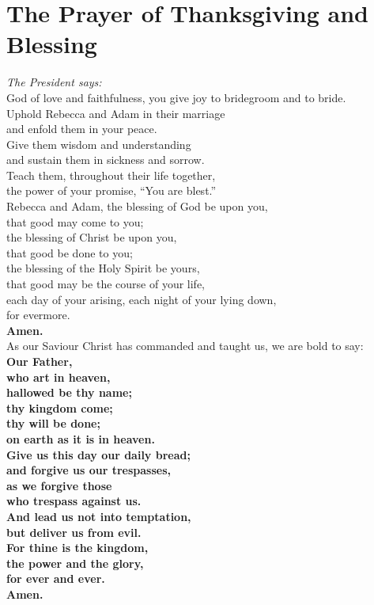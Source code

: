 \documentclass[a4paper,10pt,titlepage]{article}
\begin{document}
\clearpage
\section{The Prayer of Thanksgiving and Blessing}

{\em The President says:}\\
God of love and faithfulness, you give joy to bridegroom and to bride.\\
Uphold Rebecca and Adam in their marriage\\
and enfold them in your peace.\\
Give them wisdom and understanding\\
and sustain them in sickness and sorrow.\\
Teach them, throughout their life together,\\
the power of your promise, “You are blest.”\\


Rebecca and Adam, the blessing of God be upon you,\\
that good may come to you;\\
the blessing of Christ be upon you,\\
that good be done to you;\\
the blessing of the Holy Spirit be yours,\\
that good may be the course of your life,\\
each day of your arising, each night of your lying down,\\
for evermore.\\

{\bf Amen.}\\

As our Saviour Christ has commanded and taught us, we are bold to say:\\

{\bf Our Father,\\
who art in heaven,\\
hallowed be thy name;\\
thy kingdom come;\\
thy will be done;\\
on earth as it is in heaven.\\
Give us this day our daily bread;\\
and forgive us our trespasses,\\
as we forgive those\\
who trespass against us.\\
And lead us not into temptation,\\
but deliver us from evil.\\
For thine is the kingdom,\\
the power and the glory,\\
for ever and ever.\\
Amen.}
\end{document}
